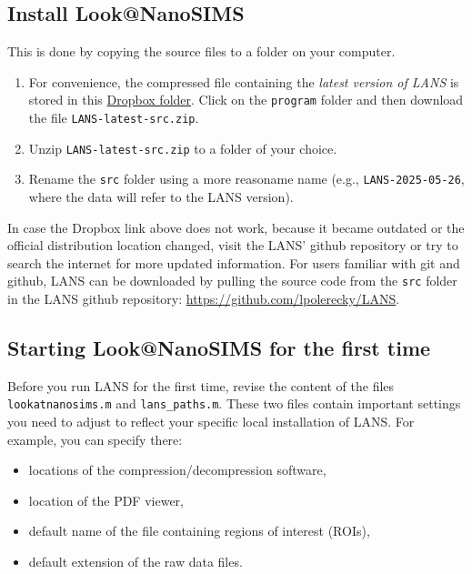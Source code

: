 \documentclass[a4paper, 11pt]{article}
\newcommand{\ttt}[1]{\texttt{#1}}
\newcommand\mnote{\marginnote{\fbox{\textbf{\bf Note}}}}
\begin{document}
\subsection{Install Look@NanoSIMS}

This is done by copying the source files to a folder on your computer.

\begin{enumerate}
 
\item For convenience, the compressed file containing the \emph{latest version of LANS} is stored in this \href{https://www.dropbox.com/sh/gyss2uvv5ggu2vl/AABViAmt9WHryEP_xZBrCG_La?dl=0}{Dropbox folder}. Click on the \ttt{program} folder and then download the file \ttt{LANS-latest-src.zip}.

\item Unzip \ttt{LANS-latest-src.zip} to a folder of your choice.

\item Rename the \ttt{src} folder using a more reasoname name (e.g., \ttt{LANS-2025-05-26}, where the data will refer to the LANS version).

\end{enumerate}

\mnote
In case the Dropbox link above does not work, because it became outdated or the official distribution location changed, visit the LANS' github repository or try to search the internet for more updated information. For users familiar with git and github, LANS can be downloaded by pulling the source code from the \ttt{src} folder in the LANS github repository: \url{https://github.com/lpolerecky/LANS}.


\subsection{Starting Look@NanoSIMS for the first time}

Before you run LANS for the first time, revise the content of the files \ttt{lookatnanosims.m} and \ttt{lans\_paths.m}. These two files contain important settings you need to adjust to reflect your specific local installation of LANS. For example, you can specify there:

\begin{itemize}
\item locations of the compression/decompression software,
\item location of the PDF viewer,
\item default name of the file containing regions of interest (ROIs),
\item default extension of the raw data files.
\end{itemize}
\end{document}
